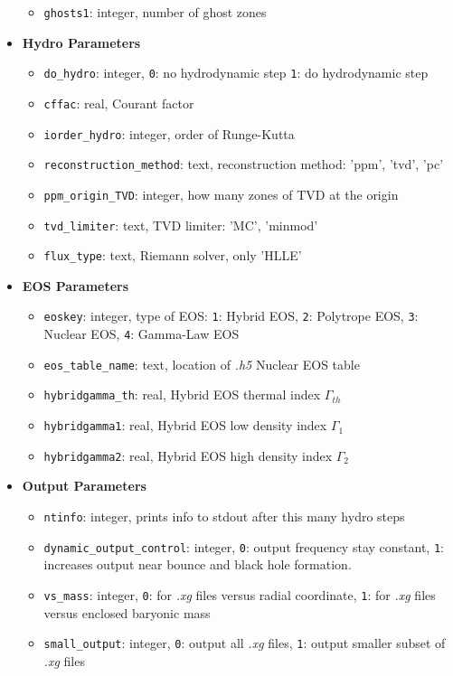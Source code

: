 \documentclass[10pt,nofootinbib]{article}
\newcommand{\code}[1]{\texttt{#1}}
\begin{document}
\begin{itemize}
\begin{itemize}
\item{{\tt ghosts1}: integer, number of ghost zones}
\end{itemize}
\item{{\bf Hydro Parameters}}
\begin{itemize}
\item{{\tt do\_hydro}: integer, \code{0}: no hydrodynamic step \code{1}: do hydrodynamic step}
\item{{\tt cffac}: real, Courant factor}
\item{{\tt iorder\_hydro}: integer, order of Runge-Kutta}
\item{{\tt reconstruction\_method}: text, reconstruction method: 'ppm', 'tvd', 'pc'}
\item{{\tt ppm\_origin\_TVD}: integer, how many zones of TVD at the origin}
\item{{\tt tvd\_limiter}: text, TVD limiter: 'MC', 'minmod'}
\item{{\tt flux\_type}: text, Riemann solver, only 'HLLE'}
\end{itemize}
\item{{\bf EOS Parameters}}
\begin{itemize}
\item{{\tt eoskey}: integer, type of EOS: \code{1}: Hybrid EOS, \code{2}: Polytrope EOS, \code{3}: Nuclear EOS, \code{4}: Gamma-Law EOS}
\item{{\tt eos\_table\_name}: text, location of {\it .h5} Nuclear EOS table}
\item{{\tt hybridgamma\_th}: real, Hybrid EOS thermal index $\Gamma_{th}$}
\item{{\tt hybridgamma1}: real, Hybrid EOS low density index $\Gamma_{1}$}
\item{{\tt hybridgamma2}: real, Hybrid EOS high density index $\Gamma_{2}$}
\end{itemize}
\item{{\bf Output Parameters}}
\begin{itemize}
\item{{\tt ntinfo}: integer, prints info to stdout after this many hydro steps}
\item{{\tt dynamic\_output\_control}: integer, \code{0}: output frequency stay constant, \code{1}: increases output near bounce and black hole formation}.
\item{{\tt vs\_mass}: integer, \code{0}: for {\it .xg} files versus radial coordinate, \code{1}: for {\it .xg} files versus enclosed baryonic mass}
\item{{\tt small\_output}: integer, \code{0}: output all {\it .xg} files, \code{1}: output smaller subset of {\it .xg} files}

\end{itemize}
\end{itemize}
\end{document}
